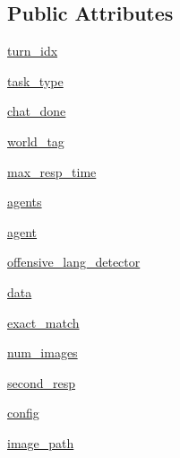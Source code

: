 \subsection*{Public Attributes}
\begin{DoxyCompactItemize}
\item 
\hyperlink{classimage__chat__collection_1_1worlds_1_1MTurkImageChatWorld_acb6317fe3c0f3ca2c81ef344e49e15d4}{turn\+\_\+idx}
\item 
\hyperlink{classimage__chat__collection_1_1worlds_1_1MTurkImageChatWorld_a61f2dbe636a6b7286febaedbcd9f5b18}{task\+\_\+type}
\item 
\hyperlink{classimage__chat__collection_1_1worlds_1_1MTurkImageChatWorld_a3cc59163cc4f2bad20f795d10a8e1b44}{chat\+\_\+done}
\item 
\hyperlink{classimage__chat__collection_1_1worlds_1_1MTurkImageChatWorld_a0be08870bfc570382e035bc0b6119b62}{world\+\_\+tag}
\item 
\hyperlink{classimage__chat__collection_1_1worlds_1_1MTurkImageChatWorld_aefe1eca5e9e0c0588cf3a938cbfc9bee}{max\+\_\+resp\+\_\+time}
\item 
\hyperlink{classimage__chat__collection_1_1worlds_1_1MTurkImageChatWorld_a4a6b3bbe92761e075e8763997d452b65}{agents}
\item 
\hyperlink{classimage__chat__collection_1_1worlds_1_1MTurkImageChatWorld_a8a1e906514af9c95bb1e859400c79a7c}{agent}
\item 
\hyperlink{classimage__chat__collection_1_1worlds_1_1MTurkImageChatWorld_a8cf95b8421df9c62f5a8029b10d4191d}{offensive\+\_\+lang\+\_\+detector}
\item 
\hyperlink{classimage__chat__collection_1_1worlds_1_1MTurkImageChatWorld_ac03c068df619250dd205eee8ecab59e3}{data}
\item 
\hyperlink{classimage__chat__collection_1_1worlds_1_1MTurkImageChatWorld_aebd5761b4adf46ed785462d375c8b762}{exact\+\_\+match}
\item 
\hyperlink{classimage__chat__collection_1_1worlds_1_1MTurkImageChatWorld_adf323947082f426bc1f082e4bde387c6}{num\+\_\+images}
\item 
\hyperlink{classimage__chat__collection_1_1worlds_1_1MTurkImageChatWorld_ac1c15938041a70c1671cd60fe94dfb04}{second\+\_\+resp}
\item 
\hyperlink{classimage__chat__collection_1_1worlds_1_1MTurkImageChatWorld_a83ee57ee0709f14bee6e64cef39ab17d}{config}
\item 
\hyperlink{classimage__chat__collection_1_1worlds_1_1MTurkImageChatWorld_ab9245c8e27f66da8d8dc91591a428433}{image\+\_\+path}
\end{DoxyCompactItemize}


